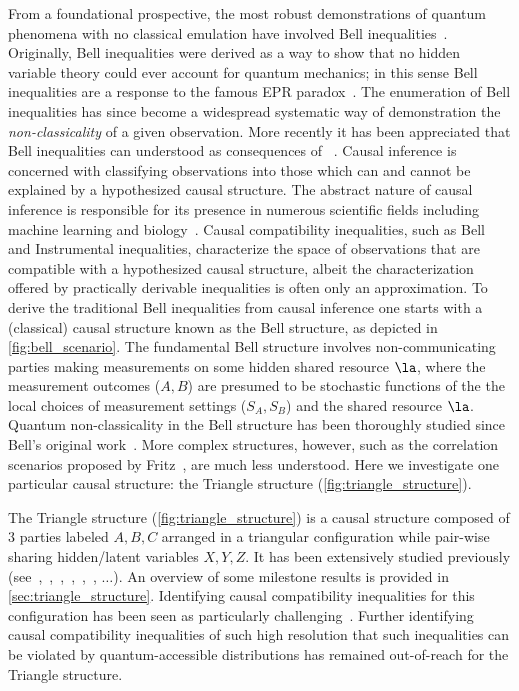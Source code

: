 \documentclass[aps, 10pt, english, twoside, pra, nofootinbib, tightenlines, longbibliography, superscriptaddress]{revtex4-1}
\begin{document}
    From a foundational prospective, the most robust demonstrations of quantum phenomena with no classical emulation have involved Bell inequalities~\cite{Bell_1964}. Originally, Bell inequalities were derived as a way to show that no hidden variable theory could ever account for quantum mechanics; in this sense Bell inequalities are a response to the famous EPR paradox~\cite{EPR_Orig}. The enumeration of Bell inequalities has since become a widespread systematic way of demonstration the \textit{non-classicality} of a given observation. More recently it has been appreciated that Bell inequalities can understood as consequences of ~\cite{Wood_2012}. Causal inference is concerned with classifying observations into those which can and cannot be explained by a hypothesized causal structure. The abstract nature of causal inference is responsible for its presence in numerous scientific fields including machine learning and biology~\cite{Pearl_2009,Pearl_2009_tr}. Causal compatibility inequalities, such as Bell and Instrumental inequalities, characterize the space of observations that are compatible with a hypothesized causal structure, albeit the characterization offered by practically derivable inequalities is often only an approximation. To derive the traditional Bell inequalities from causal inference one starts with a (classical) causal structure known as the Bell structure, as depicted in \cref{fig:bell_scenario}. The fundamental Bell structure involves non-communicating parties making measurements on some hidden shared resource $\la$, where the measurement outcomes ($A, B$) are presumed to be stochastic functions of the the local choices of measurement settings ($S_A, S_B$) and the shared resource $\la$. Quantum non-classicality in the Bell structure has been thoroughly studied since Bell's original work~\cite{Brunner_2013}. More complex structures, however, such as the correlation scenarios proposed by Fritz~\cite{Fritz_2012,Fritz_2014}, are much less understood. Here we investigate one particular causal structure: the Triangle structure (\cref{fig:triangle_structure}).

    The Triangle structure (\cref{fig:triangle_structure}) is a causal structure composed of $3$ parties labeled $A, B, C$ arranged in a triangular configuration while pair-wise sharing hidden/latent variables $X, Y, Z$. It has been extensively studied previously (see~\cite[Fig. 1]{Steudel_2010},~\cite[Fig. 6]{Chaves_2014},~\cite[Fig. 8]{Branciard_2012},~\cite[Fig. 8, App. E]{Henson_2014},~\cite[Fig. 3]{Fritz_2012},~\cite[Fig. 1]{Inflation}, $\ldots$). An overview of some milestone results is provided in \cref{sec:triangle_structure}. Identifying causal compatibility inequalities for this configuration has been seen as particularly challenging~\cite{Branciard_2012}. Further identifying causal compatibility inequalities of such high resolution that such inequalities can be violated by quantum-accessible distributions has remained out-of-reach for the Triangle structure.
\end{document}

